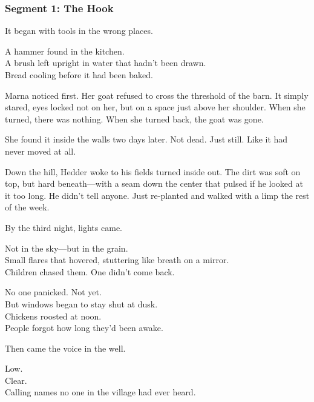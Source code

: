 \documentclass[9pt]{article}
\begin{document}
\newpage

\subsubsection*{Segment 1: The Hook}

It began with tools in the wrong places.

\vspace{0.5em}
A hammer found in the kitchen.\\
A brush left upright in water that hadn’t been drawn.\\
Bread cooling before it had been baked.

\vspace{0.5em}
Marna noticed first. Her goat refused to cross the threshold of the barn. It simply stared, eyes locked not on her, but on a space just above her shoulder. When she turned, there was nothing. When she turned back, the goat was gone.

\vspace{0.5em}
She found it inside the walls two days later. Not dead. Just still. Like it had never moved at all.

\vspace{0.5em}
Down the hill, Hedder woke to his fields turned inside out. The dirt was soft on top, but hard beneath---with a seam down the center that pulsed if he looked at it too long. He didn’t tell anyone. Just re-planted and walked with a limp the rest of the week.

\vspace{0.5em}
By the third night, lights came.

\vspace{0.5em}
Not in the sky---but in the grain.\\
Small flares that hovered, stuttering like breath on a mirror.\\
Children chased them. One didn’t come back.

\vspace{0.5em}
No one panicked. Not yet.\\
But windows began to stay shut at dusk.\\
Chickens roosted at noon.\\
People forgot how long they’d been awake.

\vspace{0.5em}
Then came the voice in the well.

\vspace{0.5em}
Low.\\
Clear.\\
Calling names no one in the village had ever heard.
\end{document}
